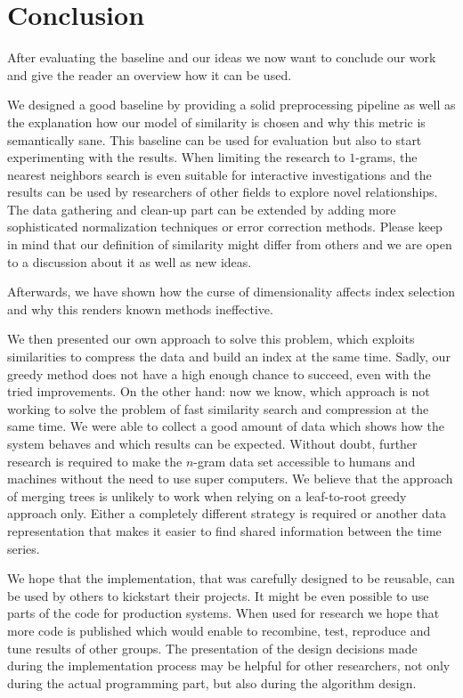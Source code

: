 \chapter{Conclusion}
\label{ch:Conclusion}

After evaluating the baseline and our ideas we now want to conclude our work and give the reader an overview how it can be used.

We designed a good baseline by providing a solid preprocessing pipeline as well as the explanation how our model of similarity is chosen and why this metric is semantically sane. This baseline can be used for evaluation but also to start experimenting with the results. When limiting the research to $1$-grams, the nearest neighbors search is even suitable for interactive investigations and the results can be used by researchers of other fields to explore novel relationships. The data gathering and clean-up part can be extended by adding more sophisticated normalization techniques or error correction methods. Please keep in mind that our definition of similarity might differ from others and we are open to a discussion about it as well as new ideas.

Afterwards, we have shown how the curse of dimensionality affects index selection and why this renders known methods ineffective.

We then presented our own approach to solve this problem, which exploits similarities to compress the data and build an index at the same time. Sadly, our greedy method does not have a high enough chance to succeed, even with the tried improvements. On the other hand: now we know, which approach is not working to solve the problem of fast similarity search and compression at the same time. We were able to collect a good amount of data which shows how the system behaves and which results can be expected. Without doubt, further research is required to make the $n$-gram data set accessible to humans and machines without the need to use super computers. We believe that the approach of merging trees is unlikely to work when relying on a leaf-to-root greedy approach only. Either a completely different strategy is required or another data representation that makes it easier to find shared information between the time series.

We hope that the implementation, that was carefully designed to be reusable, can be used by others to kickstart their projects. It might be even possible to use parts of the code for production systems. When used for research we hope that more code is published which would enable to recombine, test, reproduce and tune results of other groups. The presentation of the design decisions made during the implementation process may be helpful for other researchers, not only during the actual programming part, but also during the algorithm design.

